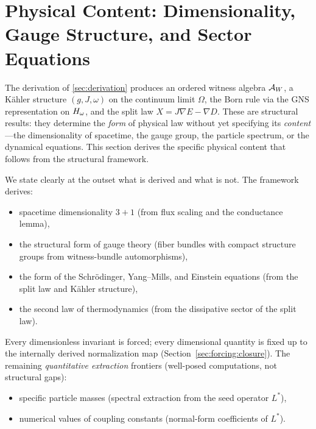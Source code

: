 
\section{Physical Content: Dimensionality, Gauge Structure, and Sector Equations}
\label{sec:physics}

The derivation of \cref{sec:derivation} produces an ordered witness algebra
$\mathcal{A}_W$, a K\"{a}hler structure $(g, J, \omega)$ on the continuum limit
$\Omega$, the Born rule via the GNS representation on $H_\omega$, and the split
law $X = J\nabla E - \nabla D$.  These are structural results: they determine
the \emph{form} of physical law without yet specifying its \emph{content}---the
dimensionality of spacetime, the gauge group, the particle spectrum, or the
dynamical equations.  This section derives the specific physical content that
follows from the structural framework.

We state clearly at the outset what is derived and what is not.  The framework
derives:
\begin{itemize}[nosep]
  \item spacetime dimensionality $3+1$ (from flux scaling and the conductance
        lemma),
  \item the structural form of gauge theory (fiber bundles with compact
        structure groups from witness-bundle automorphisms),
  \item the form of the Schr\"{o}dinger, Yang--Mills, and Einstein equations
        (from the split law and K\"{a}hler structure),
  \item the second law of thermodynamics (from the dissipative sector of the
        split law).
\end{itemize}
Every dimensionless invariant is forced; every dimensional quantity is
fixed up to the internally derived normalization map
(Section~\ref{sec:forcing:closure}).  The remaining \emph{quantitative
extraction} frontiers (well-posed computations, not structural gaps):
\begin{itemize}[nosep]
  \item specific particle masses (spectral extraction from the seed operator $L^*$),
  \item numerical values of coupling constants (normal-form coefficients of $L^*$).
\end{itemize}


